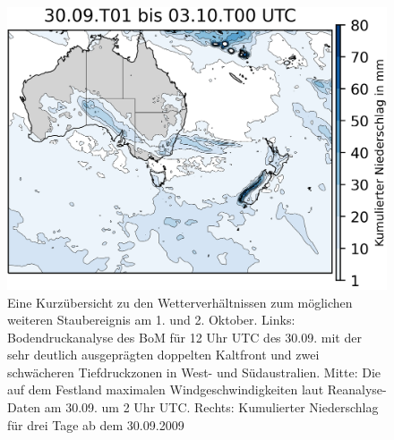 \documentclass[12pt,a4paper,onecolumn]{scrartcl}
\begin{document}
\begin{figure}[!htb]
\begin{minipage}[c]{0.35\textwidth}
	\end{minipage}\hfill
	\begin{minipage}[c]{0.33\textwidth}
		\includegraphics[width=\textwidth]{bilder/rain_october_small.png}
	\end{minipage}\hfill
	\caption{Eine Kurzübersicht zu den Wetterverhältnissen zum möglichen weiteren Staubereignis am 1. und 2. Oktober. Links: Bodendruckanalyse des BoM für 12 Uhr UTC des 30.09. mit der sehr deutlich ausgeprägten doppelten Kaltfront und zwei schwächeren Tiefdruckzonen in West- und Südaustralien. Mitte: Die auf dem Festland maximalen Windgeschwindigkeiten laut Reanalyse-Daten am 30.09. um 2 Uhr UTC. Rechts: Kumulierter Niederschlag für drei Tage ab dem 30.09.2009} \label{fig:october_weather}
\end{figure}
\end{document}

